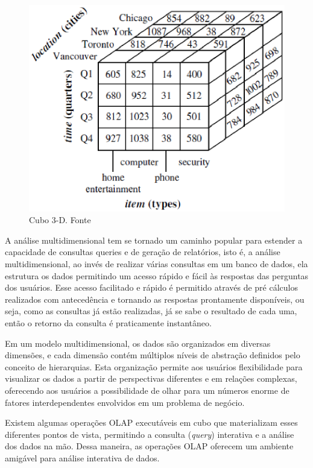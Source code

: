 \begin{figure}[!htb]
	\centering
		\includegraphics{figuras/cubo3d.eps}
		\caption{Cubo 3-D. Fonte \cite{han}}
		\label{arqcentralizada}
\end{figure}

A análise multidimensional tem se tornado um caminho popular para estender a capacidade de consultas queries e de geração de relatórios, isto é, a análise multidimensional, ao invés de realizar várias consultas em um banco de dados, ela estrutura os dados permitindo um acesso rápido e fácil às respostas das perguntas dos usuários. Esse acesso facilitado e rápido é permitido através de pré cálculos realizados com antecedência e tornando as respostas prontamente disponíveis, ou seja, como as consultas já estão realizadas, já se sabe o resultado de cada uma, então o retorno da consulta é praticamente instantâneo. \cite{redbooks}

Em um modelo multidimensional, os dados são organizados em diversas dimensões, e cada dimensão contém múltiplos níveis de abstração definidos pelo conceito de hierarquias. Esta organização permite aos usuários flexibilidade para visualizar os dados a partir de perspectivas diferentes e em relações complexas\cite{han}, oferecendo aos usuários a possibilidade de olhar para um números enorme de fatores interdependentes envolvidos em um problema de negócio. \cite{redbooks}

Existem algumas operações OLAP executáveis em cubo que materializam esses diferentes pontos de vista, permitindo a consulta (\textit{query}) interativa e a análise dos dados na mão. Dessa maneira, as operações OLAP oferecem um ambiente amigável para análise interativa de dados. \cite{han}


